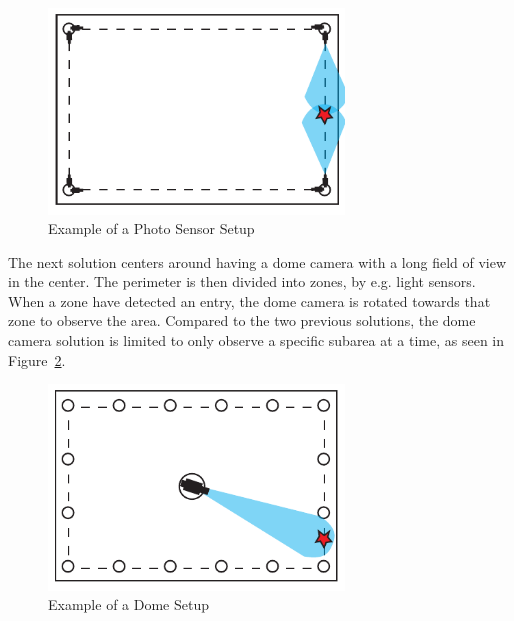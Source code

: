\begin{figure}[htb]
    \centering
    \includegraphics[width=0.7\textwidth]{gfx/light_sensor.pdf}
    \caption{Example of a Photo Sensor Setup}
    \label{fig:photo_sensor}
\end{figure}

The next solution centers around having a dome camera with a long field of view in the center.
The perimeter is then divided into zones, by e.g. light sensors.
When a zone have detected an entry, the dome camera is rotated towards that zone to observe the area.
Compared to the two previous solutions, the dome camera solution is limited to only observe a specific subarea at a time, as seen in Figure~\ref{fig:drone_sensor}. \\

\begin{figure}[htb]
    \centering
    \includegraphics[width=0.7\textwidth]{gfx/drome_sensor.pdf}
    \caption{Example of a Dome Setup}
    \label{fig:drone_sensor}
\end{figure}
